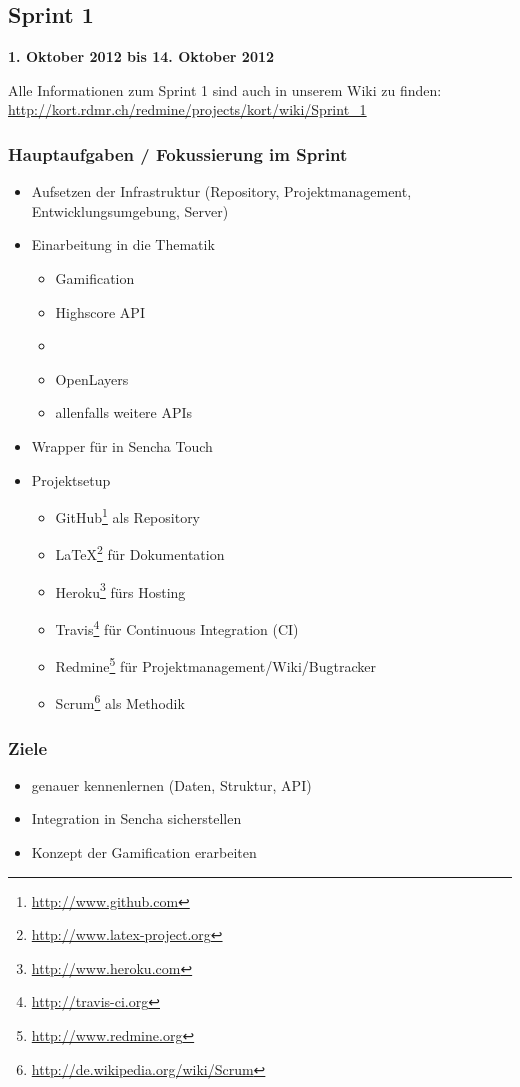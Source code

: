 \subsection{Sprint 1}

\textbf{1. Oktober 2012 bis 14. Oktober 2012}

Alle Informationen zum Sprint 1 sind auch in unserem Wiki zu finden:
\url{http://kort.rdmr.ch/redmine/projects/kort/wiki/Sprint_1}

\subsubsection{Hauptaufgaben / Fokussierung im Sprint}

\begin{itemize}
	\item Aufsetzen der Infrastruktur (Repository, Projektmanagement, Entwicklungsumgebung, Server)
	\item Einarbeitung in die Thematik
	\begin{itemize}
		\item Gamification
		\item Highscore API
		\item {}
		\item OpenLayers
		\item allenfalls weitere \gls{API}s
	\end{itemize}
	\item Wrapper für  in Sencha Touch
	\item Projektsetup
	\begin{itemize}
		\item GitHub\footnote{\url{http://www.github.com}} als Repository
		\item \LaTeX{}\footnote{\url{http://www.latex-project.org}} für Dokumentation
		\item Heroku\footnote{\url{http://www.heroku.com}} fürs Hosting
		\item Travis\footnote{\url{http://travis-ci.org}} für Continuous Integration (CI)
		\item Redmine\footnote{\url{http://www.redmine.org}} für Projektmanagement/Wiki/Bugtracker
		\item Scrum\footnote{\url{http://de.wikipedia.org/wiki/Scrum}} als Methodik
	\end{itemize}
\end{itemize}

\subsubsection{Ziele}
\begin{itemize}
	\item {} genauer kennenlernen (Daten, Struktur, \gls{API})
	\item Integration in Sencha sicherstellen
	\item Konzept der \gls{Gamification} erarbeiten
\end{itemize}

